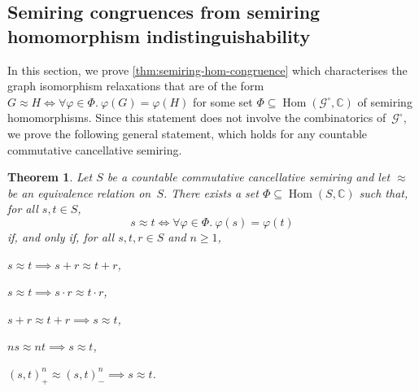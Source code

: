 \documentclass[11pt]{scrartcl}
\theoremstyle{definition}
\theoremstyle{plain}
\newtheorem{theorem}[definition]{Theorem}
\theoremstyle{remark}
\renewcommand\phi\varphi
\DeclareMathOperator\Hom{Hom}
\newcommand{\lG}{\mathcal{G}^\circ}
\begin{document}
	\subsection{Semiring congruences from semiring homomorphism indistinguishability}
	\label{sec:semiring-congruence-indistingishability}
	In this section, we prove \cref{thm:semiring-hom-congruence} which characterises the graph isomorphism relaxations that are of the form $G \approx H \iff \forall \phi \in \Phi.\ \phi(G) = \phi(H)$ for some set $\Phi \subseteq \Hom(\lG, \mathbb{C})$ of semiring homomorphisms.
	Since this statement does not involve the combinatorics of~$\lG$, we prove the following general statement, which holds for any countable commutative cancellative semiring.

	\begin{theorem}\label{thm:phi-abstract}
		Let $S$ be a countable commutative cancellative semiring
		and let $\approx$ be an equivalence relation on~$S$.
		There exists a set $\Phi \subseteq \Hom(S, \mathbb{C})$ such that, for all $s, t \in S$,
		\[
			s \approx t \iff \forall \phi \in \Phi.\ \phi(s) = \phi(t)
		\]
		if, and only if,
		for all $s, t,r \in S$ and $n \geq 1$,
		\begin{assertions}
			\item\label{it:phi-add} $s \approx t \implies s + r \approx t +r$,
			\item\label{it:phi-mult} $s \approx t \implies s \cdot r \approx t \cdot r$,
			\item\label{it:phi-cancel} $s +r \approx t +r \implies s \approx t$,
			\item\label{it:phi-torsion} $n s \approx nt \implies s \approx t$,
			\item\label{it:phi-radical} $(s, t)^n_+ \approx (s, t)^n_- \implies s\approx t$.
		\end{assertions}
	\end{theorem}
\end{document}
